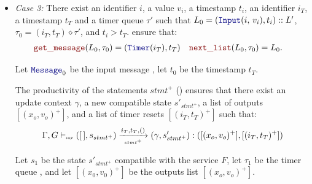 \begin{skippableproof}
\begin{itemize}
\begin{itemize}
                        The rule  ensures
                        that:
                        \begin{equation*}
                            \serviceOpSem{s_0}{\tau_0}{F}{\mess_0}{t_0}{s_1}{\tau_1}{(x_0, v_0)^+},
                        \end{equation*}

                        Let $L_1$ be the remaining list $L'$.

                  \item \textit{Case 3:} There exist an identifier $i$, a value $v_i$, a timestamp
                        $t_i$, an identifier $i_T$, a timestamp $t_T$ and a timer queue $\tau'$ such
                        that $L_0 = (\inputMess{i}{v_i}, t_i) :: L'$, $\tau_0 = (i_T, t_T) \diamond
                            \tau'$, and $t_i > t_T$.
                        ensure that:
                        \begin{align*}
                            \getMess{L_0}{\tau_0}  & = (\timerMess{i_T}, t_T) &
                            \nextList{L_0}{\tau_0} & = L_0.
                        \end{align*}

                        Let $\mess_0$ be the input message , let $t_0$ be the
                        timestamp $t_T$.

                        The productivity of the statements $stmt^+$ () ensures that there exist an update context
                        $\gamma$, a new compatible state $s'_{stmt^+}$, a list of outputs $[(x_o,
                                    v_o)^+]$, and a list of timer resets $[(i_T, t_T)^+]$ such that:
                        \begin{equation*}
                            \Gamma, G \vdash_{\textnormal{\tiny\textsc{frp}}} ([\,], s_{stmt^+}) \xrightarrow[\mbox{\tiny\ensuremath{stmt^+}}]{i_T, t_T, ()} (\gamma, s'_{stmt^+}): ([(x_o, v_o)^+], [(i_T, t_T)^+])
                        \end{equation*}

                        Let $s_1$ be the state $s'_{stmt^+}$ compatible with the service $F$, let
                        $\tau_1$ be the timer queue , and let $[(x_0,
                                    v_0)^+]$ be the outputs list $[(x_o, v_o)^+]$.


\end{itemize}
\end{itemize}
\end{skippableproof}
